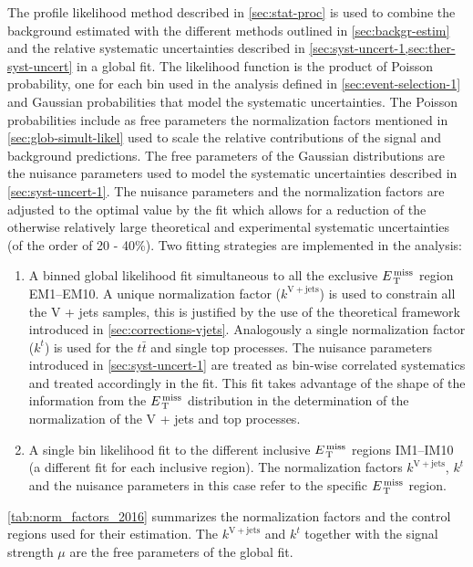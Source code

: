 The profile likelihood method described in \cref{sec:stat-proc} is used to
combine the background estimated with the different methods outlined in
\cref{sec:backgr-estim} and the relative systematic uncertainties described in
\cref{sec:syst-uncert-1,sec:ther-syst-uncert} in a global fit. The likelihood
function is the product of Poisson probability, one for each bin used in the
analysis defined in \cref{sec:event-selection-1} and Gaussian probabilities that
model the systematic uncertainties. The Poisson probabilities include as free
parameters the normalization factors mentioned in \cref{sec:glob-simult-likel}
used to scale the relative contributions of the signal and background
predictions. The free parameters of the Gaussian distributions are the nuisance
parameters used to model the systematic uncertainties described in
\cref{sec:syst-uncert-1}. The nuisance parameters and the normalization factors
are adjusted to the optimal value by the fit which allows for a reduction of the
otherwise relatively large theoretical and experimental systematic uncertainties
(of the order of 20 - 40\%). Two fitting strategies are implemented in the
analysis:
\begin{enumerate}[A -]
\item A binned global likelihood fit simultaneous to all the exclusive $E_\mathrm{\, T}^\mathrm{\, miss}$
  region EM1--EM10. A unique normalization factor ($k^\mathrm{V + jets}$) is
  used to constrain all the V + jets samples, this is justified by the use of
  the theoretical framework introduced in
  \cref{sec:corrections-vjets}. Analogously a single normalization factor
  ($k^t$) is used for the $t \bar{t}$ and single top processes. The nuisance
  parameters introduced in \cref{sec:syst-uncert-1} are treated as bin-wise
  correlated systematics and treated accordingly in the fit. This fit takes
  advantage of the shape of the information from the $E_\mathrm{\, T}^\mathrm{\, miss}$ distribution in the
  determination of the normalization of the V + jets and top processes.
\item A single bin likelihood fit to the different inclusive $E_\mathrm{\, T}^\mathrm{\, miss}$ regions
  IM1--IM10 (a different fit for each inclusive region). The normalization
  factors $k^\mathrm{V + jets}$, $k^t$ and the nuisance parameters in this case
  refer to the specific $E_\mathrm{\, T}^\mathrm{\, miss}$ region.
\end{enumerate}
\cref{tab:norm_factors_2016} summarizes the normalization factors and the
control regions used for their estimation. The $k^\mathrm{V + jets}$ and $k^t$
together with the signal strength $\mu$ are the free parameters of the global
fit.
